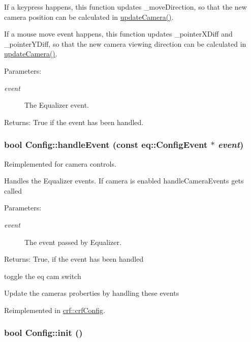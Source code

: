 If a keypress happens, this function updates \_\-moveDirection, so that the new camera position can be calculated in \hyperlink{a00003_b7754b48a74e7927643d3e2e6ca3c8ed}{updateCamera()}. 

If a mouse move event happens, this function updates \_\-pointerXDiff and \_\-pointerYDiff, so that the new camera viewing direction can be calculated in \hyperlink{a00003_b7754b48a74e7927643d3e2e6ca3c8ed}{updateCamera()}. \begin{Desc}
\item[Parameters:]
\begin{description}
\item[{\em event}]The Equalizer event. \end{description}
\end{Desc}
\begin{Desc}
\item[Returns:]True if the event has been handled. \end{Desc}
\hypertarget{a00003_0ac41bd28010ff7f7638beb051b6c9b9}{
\subsubsection[{handleEvent}]{\setlength{\rightskip}{0pt plus 5cm}bool Config::handleEvent (const eq::ConfigEvent $\ast$ {\em event})}}
\label{a00003_0ac41bd28010ff7f7638beb051b6c9b9}


Reimplemented for camera controls. 

Handles the Equalizer events. If camera is enabled handleCameraEvents gets called \begin{Desc}
\item[Parameters:]
\begin{description}
\item[{\em event}]The event passed by Equalizer. \end{description}
\end{Desc}
\begin{Desc}
\item[Returns:]True, if the event has been handled \end{Desc}


toggle the eq cam switch

Update the cameras proberties by handling these events 

Reimplemented in \hyperlink{a00004_63938a0cf75d236b677c4cb147933b3c}{crf::crfConfig}.\hypertarget{a00003_73ab12bbf273fd4ff7e2dea65ee3e6f8}{
\subsubsection[{init}]{\setlength{\rightskip}{0pt plus 5cm}bool Config::init ()}}
\label{a00003_73ab12bbf273fd4ff7e2dea65ee3e6f8}


